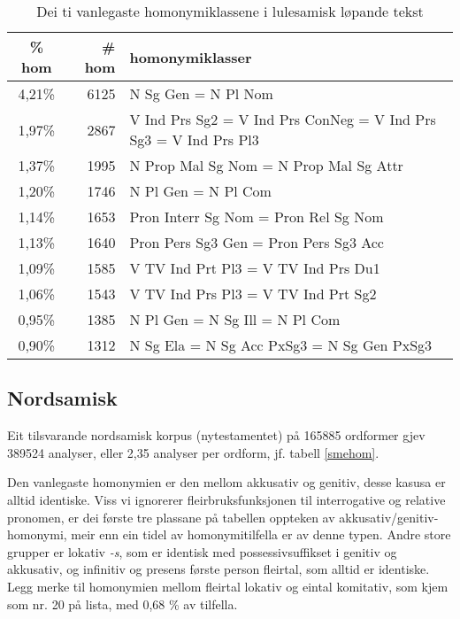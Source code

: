 \documentclass[a4paper,nynorsk]{article}
\begin{document}
\begin{table}[htdp]
\caption{Dei ti vanlegaste homonymiklassene i lulesamisk løpande tekst}
\begin{center}
\begin{tabular}{|c|r|l|}
\hline
\% hom & \# hom & homonymiklasser \\
\hline
4,21\% & 6125 & N Sg Gen  =  N Pl Nom  \\
1,97\% & 2867 & V Ind Prs Sg2  =  V Ind Prs ConNeg  =  V Ind Prs Sg3  =  V Ind Prs Pl3  \\
1,37\% & 1995 & N Prop Mal Sg Nom  =  N Prop Mal Sg Attr  \\
1,20\% & 1746 & N Pl Gen  =  N Pl Com  \\
1,14\% & 1653 & Pron Interr Sg Nom  =  Pron Rel Sg Nom  \\
1,13\% & 1640 & Pron Pers Sg3 Gen  =  Pron Pers Sg3 Acc  \\
1,09\% & 1585 & V TV Ind Prt Pl3  =  V TV Ind Prs Du1  \\
1,06\% & 1543 & V TV Ind Prs Pl3  =  V TV Ind Prt Sg2  \\
0,95\% & 1385 & N Pl Gen  =  N Sg Ill  =  N Pl Com  \\
0,90\% & 1312 & N Sg Ela  =  N Sg Acc PxSg3  =  N Sg Gen PxSg3  \\
\hline
\end{tabular}
\end{center}
\label{smjhom}
\end{table}%

\subsection{Nordsamisk}

Eit tilsvarande nordsamisk korpus (nytestamentet) på 165885 ordformer gjev 389524 analyser, eller 2,35 analyser per ordform, jf. tabell \ref{smehom}.%

Den vanlegaste homonymien er den mellom akkusativ og genitiv, desse kasusa er alltid identiske. Viss vi ignorerer fleirbruksfunksjonen til interrogative og relative pronomen, er dei første tre plassane på tabellen oppteken av akkusativ/genitiv-homonymi, meir enn ein tidel av homonymitilfella er av denne typen. Andre store grupper er lokativ \emph{-s}, som er identisk med possessivsuffikset i genitiv og akkusativ, og infinitiv og presens første person fleirtal, som alltid er identiske. Legg merke til homonymien mellom fleirtal lokativ og eintal komitativ, som kjem som nr. 20 på lista, med 0,68 \% av tilfella.%
\end{document}
